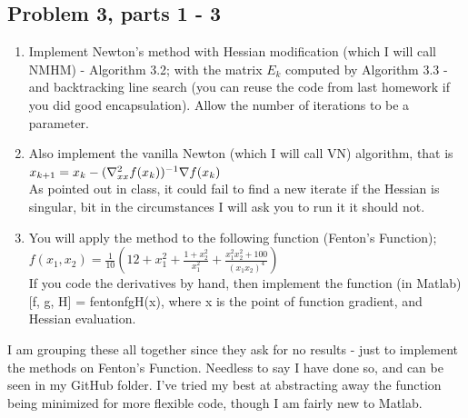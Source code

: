 \subsection{Problem 3, parts 1 - 3}
\begin{enumerate}
    \item Implement Newton's method with Hessian modification (which I will call NMHM)  - Algorithm 3.2; with the matrix $E_k$ computed by Algorithm 3.3 - and backtracking line search (you can reuse the code from last homework if you did good encapsulation). Allow the number of iterations to be a parameter.
    \item Also implement the vanilla Newton (which I will call VN) algorithm, that is\\
    $x_{k+1} = x_k - (\nabla^2_{xx}f(x_k))^{-1} \nabla f(x_k)$\\
    As pointed out in class, it could fail to find a new iterate if the Hessian is singular, bit in the circumstances I will ask you to run it it should not. 
    \item You will apply the method to the following function (Fenton's Function); \\
    $f(x_1, x_2) = \frac{1}{10}\left ( 12 + x_1^2 + \frac{1 + x_2^2}{x_1^2} + \frac{x_1^2x_2^2 + 100}{(x_1x_2)^4}\right)$\\
    If you code the derivatives by hand, then implement the function (in Matlab) [f, g, H] = fentonfgH(x), where x is the point of function gradient, and Hessian evaluation.
\end{enumerate}
\partbreak
\begin{solution}

    I am grouping these all together since they ask for no results - just to implement the methods on Fenton's Function. Needless to say I have done so, and can be seen in my GitHub folder. I've tried my best at abstracting away the function being minimized for more flexible code, though I am fairly new to Matlab. 
\end{solution}

\newpage
